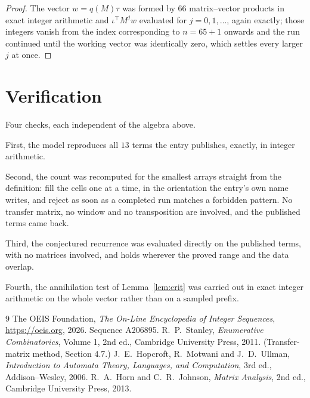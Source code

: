 \documentclass[11pt,a4paper]{article}
\theoremstyle{plain}
\theoremstyle{definition}
\begin{document}
\begin{proof}
The vector $w=q(M)\tau$ was formed by $66$ matrix--vector products in exact integer
arithmetic and $\iota^{\!\top}M^{j}w$ evaluated for $j=0,1,\dots$, again exactly; those
integers vanish from the index corresponding to $n=65+1$ onwards and the run continued
until the working vector was identically zero, which settles every larger $j$ at once.
\end{proof}

\section{Verification}

Four checks, each independent of the algebra above.

First, the model reproduces all $13$ terms the entry publishes, exactly, in integer
arithmetic.

Second, the count was recomputed for the smallest arrays straight from the definition: fill the
cells one at a time, in the orientation the entry's own name writes, and reject as soon as a
completed run matches a forbidden pattern. No transfer matrix, no window and no transposition
are involved, and the published terms came back.

Third, the conjectured recurrence was evaluated directly on the published terms, with no
matrices involved, and holds wherever the proved range and the data overlap.

Fourth, the annihilation test of Lemma~\ref{lem:crit} was carried out in exact integer
arithmetic on the whole vector rather than on a sampled prefix.

\begin{thebibliography}{9}
 The OEIS Foundation, \emph{The On-Line Encyclopedia of Integer
Sequences}, \url{https://oeis.org}, 2026. Sequence A206895.
 R.~P.~Stanley, \emph{Enumerative Combinatorics}, Volume 1, 2nd ed.,
Cambridge University Press, 2011. (Transfer-matrix method, Section 4.7.)
 J.~E.~Hopcroft, R.~Motwani and J.~D.~Ullman, \emph{Introduction to Automata
Theory, Languages, and Computation}, 3rd ed., Addison--Wesley, 2006.
 R.~A.~Horn and C.~R.~Johnson, \emph{Matrix Analysis}, 2nd ed., Cambridge
University Press, 2013.
\end{thebibliography}
\end{document}
